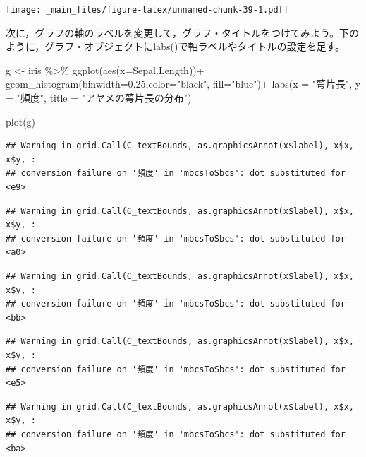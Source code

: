 \documentclass[
]{book}
\newenvironment{Shaded}{\begin{snugshade}}{\end{snugshade}}
\newcommand{\AttributeTok}[1]{\textcolor[rgb]{0.77,0.63,0.00}{#1}}
\newcommand{\FloatTok}[1]{\textcolor[rgb]{0.00,0.00,0.81}{#1}}
\newcommand{\FunctionTok}[1]{\textcolor[rgb]{0.00,0.00,0.00}{#1}}
\newcommand{\NormalTok}[1]{#1}
\newcommand{\OtherTok}[1]{\textcolor[rgb]{0.56,0.35,0.01}{#1}}
\newcommand{\SpecialCharTok}[1]{\textcolor[rgb]{0.00,0.00,0.00}{#1}}
\newcommand{\StringTok}[1]{\textcolor[rgb]{0.31,0.60,0.02}{#1}}
\begin{document}
\texttt{[image: \_main\_files/figure-latex/unnamed-chunk-39-1.pdf]}

次に，グラフの軸のラベルを変更して，グラフ・タイトルをつけてみよう。下のように，グラフ・オブジェクトにlabs()で軸ラベルやタイトルの設定を足す。

\begin{Shaded}
\begin{Highlighting}[]
\NormalTok{g }\OtherTok{\textless{}{-}}\NormalTok{ iris }\SpecialCharTok{\%\textgreater{}\%} 
  \FunctionTok{ggplot}\NormalTok{(}\FunctionTok{aes}\NormalTok{(}\AttributeTok{x=}\NormalTok{Sepal.Length))}\SpecialCharTok{+}
  \FunctionTok{geom\_histogram}\NormalTok{(}\AttributeTok{binwidth=}\FloatTok{0.25}\NormalTok{,}\AttributeTok{color=}\StringTok{"black"}\NormalTok{, }\AttributeTok{fill=}\StringTok{"blue"}\NormalTok{)}\SpecialCharTok{+}
  \FunctionTok{labs}\NormalTok{(}\AttributeTok{x =} \StringTok{"萼片長"}\NormalTok{, }\AttributeTok{y =} \StringTok{"頻度"}\NormalTok{, }\AttributeTok{title =} \StringTok{"アヤメの萼片長の分布"}\NormalTok{)}

\FunctionTok{plot}\NormalTok{(g)}
\end{Highlighting}
\end{Shaded}

\begin{verbatim}
## Warning in grid.Call(C_textBounds, as.graphicsAnnot(x$label), x$x, x$y, :
## conversion failure on '頻度' in 'mbcsToSbcs': dot substituted for <e9>
\end{verbatim}

\begin{verbatim}
## Warning in grid.Call(C_textBounds, as.graphicsAnnot(x$label), x$x, x$y, :
## conversion failure on '頻度' in 'mbcsToSbcs': dot substituted for <a0>
\end{verbatim}

\begin{verbatim}
## Warning in grid.Call(C_textBounds, as.graphicsAnnot(x$label), x$x, x$y, :
## conversion failure on '頻度' in 'mbcsToSbcs': dot substituted for <bb>
\end{verbatim}

\begin{verbatim}
## Warning in grid.Call(C_textBounds, as.graphicsAnnot(x$label), x$x, x$y, :
## conversion failure on '頻度' in 'mbcsToSbcs': dot substituted for <e5>
\end{verbatim}

\begin{verbatim}
## Warning in grid.Call(C_textBounds, as.graphicsAnnot(x$label), x$x, x$y, :
## conversion failure on '頻度' in 'mbcsToSbcs': dot substituted for <ba>
\end{verbatim}
\end{document}
